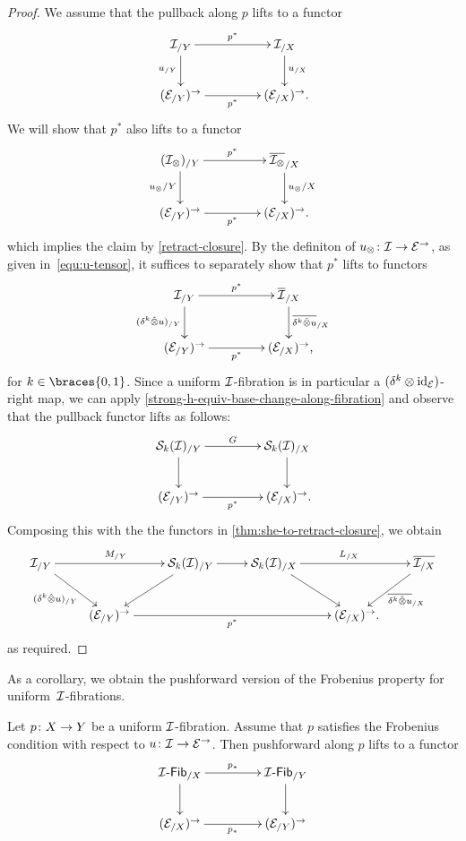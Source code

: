 \documentclass[reqno,10pt,a4paper,oneside,draft]{amsart}
\begin{document}
\begin{proof}
We assume that the pullback along $p$ lifts to a functor
\[
\xymatrix@C+2em{
  \cal{I}_{/Y}
  \ar[r]^{p^*}
  \ar[d]_{u_{/Y}}
&
  \cal{I}_{/X}
  \ar[d]^{u_{/X}}
\\
  (\catE_{/Y})^\to
  \ar[r]_{p^*}
&
  (\catE_{/X})^\to \rlap{.}
}
\]
We will show that $p^*$ also lifts to a functor
\[
\xymatrix@C+2em{
  (\cal{I}_\otimes)_{/Y} \ar[r]^{p^*} \ar[d]_{u_{\otimes}/Y} & \overline{\cal{I}_\otimes}_{/X} \ar[d]^{u_{\otimes}/X} \\
  (\catE_{/Y})^\to \ar[r]_{p^*} & (\catE_{/X})^\to \rlap{.}
}
\]
which implies the claim by \cref{retract-closure}.
By the definiton of $u_\otimes \co \cal{I} \to \catE^\to$, as given in~\eqref{equ:u-tensor}, it suffices to separately show that $p^*$ lifts to functors
\[
\xymatrix@C+2em{
  \cal{I}_{/Y}
  \ar[r]^{p^*}
  \ar[d]_{(\kcyl \hatotimes u)_{/Y}}
&
  \overline{\cal{I}}_{/X}
  \ar[d]^{ \overline{\kcyl \hatotimes u}_{/X}}
\\
  (\catE_{/Y})^\to
  \ar[r]_{p^*}
&
  (\catE_{/X})^\to \rlap{,}
}
\]
for $k \in \braces{0, 1}$.
Since a uniform $\cal{I}$-fibration is in particular a $(\kcyl \otimes \id_\catE)$-right map, we can apply \cref{strong-h-equiv-base-change-along-fibration} and observe that the pullback functor lifts as follows:
\[
\xymatrix@C+2em{
  \cal{S}_k(\cal{I})_{/Y}
  \ar[r]^{G}
  \ar[d]
&
  \cal{S}_k(\cal{I})_{/X}
  \ar[d] \\
  (\catE_{/Y})^\to
  \ar[r]_{p^*}
&
  (\catE_{/X})^\to \rlap{.}
}
\]
Composing this with the the functors in \cref{thm:she-to-retract-closure}, we obtain
\[
\xymatrix{
  \cal{I}_{/Y}
  \ar[rr]^{M_{/Y}}
  \ar[dr]_{(\kcyl \hatotimes u)_{/Y}} &
&
  \cal{S}_k(\cal{I})_{/Y}
  \ar[r]
  \ar[dl]
&
  \cal{S}_k(\cal{I})_{/X}
  \ar[rr]^{L_{/X}}
  \ar[dr]
& &
  \overline{\cal{I}_{/X}}
  \ar[dl]^{\overline{\kcyl \hatotimes u}_{/X}}
\\ &
  (\catE_{/Y})^\to
  \ar[rrr]_{p^*}
&&&
  (\catE_{/X})^\to \rlap{.}
}
\]
as required.
\end{proof}

As a corollary, we obtain the pushforward version of the Frobenius property for uniform~$\cal{I}$-fibrations.

\begin{corollary} \label{thm:frobenius-pushforward}
Let $p \co X \to Y$ be a uniform $\cal{I}$-fibration.
Assume that $p$ satisfies the Frobenius condition with respect to $u \co \cal{I} \to \catE^\to$.
Then pushforward along $p$ lifts to a functor
\[
\xymatrix@C+2em{
  \Fib[\cal{I}]_{/X} \ar[r]^{p_*} \ar[d] & \Fib[\cal{I}]_{/Y} \ar[d] \\
  (\catE_{/X})^\to \ar[r]_{p_*} & (\catE_{/Y})^\to
}
\]
\end{corollary}
\end{document}
